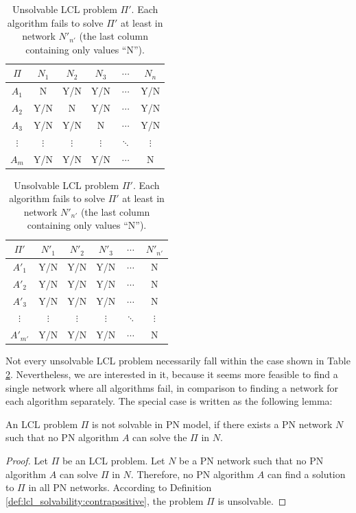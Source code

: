 \begin{table}[H]
    \parbox{.45\linewidth}{
    \centering
        \begin{tabular}{c|ccccc}
        $\Pi$&$N_1$&$N_2$&$N_3$&$\cdots$&$N_n$ \\
        \hline
        $A_1$& N & Y/N & Y/N & $\cdots$ &  Y/N  \\
        $A_2$& Y/N & N & Y/N & $\cdots$ &  Y/N  \\
        $A_3$& Y/N & Y/N & N& $\cdots$ &  Y/N  \\
        $\vdots$&$\vdots$&$\vdots$&$\vdots$&$\ddots$&$\vdots$ \\
        $A_{m}$& Y/N & Y/N & Y/N & $\cdots$ &  N \\
        \hline
        \end{tabular}
    \caption{
        Unsolvable LCL problem $\Pi$.
        Each algorithm fails to solve $\Pi$ in at least some network, denoted by ``N'' (No).
    }
    \label{tbl:unsolvable_lcl:1}
    }
    \hfill
    \parbox{.45\linewidth}{
        \centering
        \begin{tabular}{c|ccccc}
        $\Pi'$&$N'_1$&$N'_2$&$N'_3$&$\cdots$&$N'_{n'}$ \\
        \hline
        $A'_1$& Y/N & Y/N & Y/N & $\cdots$ &  N \\
        $A'_2$& Y/N & Y/N & Y/N & $\cdots$ &  N \\
        $A'_3$& Y/N & Y/N & Y/N & $\cdots$ &  N \\
        $\vdots$&$\vdots$&$\vdots$&$\vdots$&$\ddots$&$\vdots$ \\
        $A'_{m'}$& Y/N & Y/N & Y/N & $\cdots$ &  N \\
        \hline
        \end{tabular}
    \caption{
        Unsolvable LCL problem $\Pi'$.
        Each algorithm fails to solve $\Pi'$ at least in network $N'_{n'}$ (the last column containing only values ``N'').
    }
    \label{tbl:unsolvable_lcl:2}
    }
\end{table}

Not every unsolvable LCL problem necessarily fall within the case shown in Table \ref{tbl:unsolvable_lcl:2}.
Nevertheless, we are interested in it, because it seems more feasible to find a single network where all algorithms fail, in comparison to finding a network for each algorithm separately.
The special case is written as the following lemma:

\begin{lemma} \label{lem:lcl_unsolvability}
    An LCL problem $\Pi$ is not solvable in PN model, if there exists a PN network $N$ such that no PN algorithm $A$ can solve the $\Pi$ in $N$.
\end{lemma}
\begin{proof}
    Let $\Pi$ be an LCL problem.
    Let $N$ be a PN network such that no PN algorithm $A$ can solve $\Pi$ in $N$.
    Therefore, no PN algorithm $A$ can find a solution to $\Pi$ in all PN networks.
    According to Definition \ref{def:lcl_solvability:contrapositive}, the problem $\Pi$ is unsolvable.
\end{proof}

